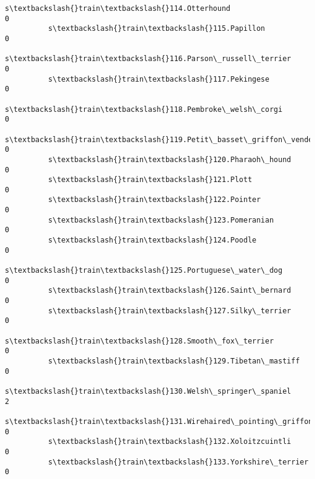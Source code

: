 \documentclass[11pt]{article}
\begin{document}
\begin{Verbatim}[commandchars=\\\{\}]
          s\textbackslash{}train\textbackslash{}114.Otterhound                                                           0   
          s\textbackslash{}train\textbackslash{}115.Papillon                                                             0   
          s\textbackslash{}train\textbackslash{}116.Parson\_russell\_terrier                                               0   
          s\textbackslash{}train\textbackslash{}117.Pekingese                                                            0   
          s\textbackslash{}train\textbackslash{}118.Pembroke\_welsh\_corgi                                                 0   
          s\textbackslash{}train\textbackslash{}119.Petit\_basset\_griffon\_vendeen                                         0   
          s\textbackslash{}train\textbackslash{}120.Pharaoh\_hound                                                        0   
          s\textbackslash{}train\textbackslash{}121.Plott                                                                0   
          s\textbackslash{}train\textbackslash{}122.Pointer                                                              0   
          s\textbackslash{}train\textbackslash{}123.Pomeranian                                                           0   
          s\textbackslash{}train\textbackslash{}124.Poodle                                                               0   
          s\textbackslash{}train\textbackslash{}125.Portuguese\_water\_dog                                                 0   
          s\textbackslash{}train\textbackslash{}126.Saint\_bernard                                                        0   
          s\textbackslash{}train\textbackslash{}127.Silky\_terrier                                                        0   
          s\textbackslash{}train\textbackslash{}128.Smooth\_fox\_terrier                                                   0   
          s\textbackslash{}train\textbackslash{}129.Tibetan\_mastiff                                                      0   
          s\textbackslash{}train\textbackslash{}130.Welsh\_springer\_spaniel                                               2   
          s\textbackslash{}train\textbackslash{}131.Wirehaired\_pointing\_griffon                                          0   
          s\textbackslash{}train\textbackslash{}132.Xoloitzcuintli                                                       0   
          s\textbackslash{}train\textbackslash{}133.Yorkshire\_terrier                                                    0   
          

\end{Verbatim}
\end{document}
